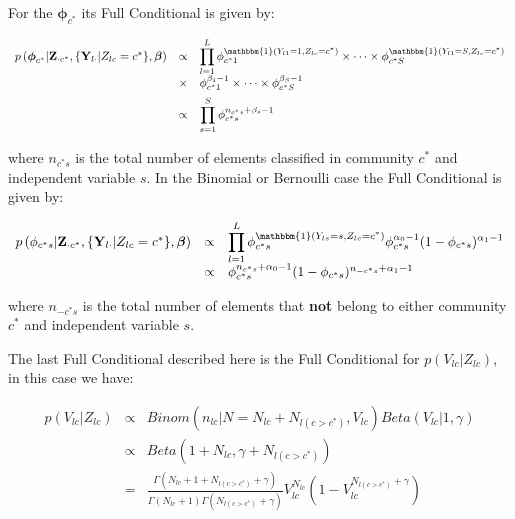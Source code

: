 \documentclass[article]{jss}
\begin{document}
For the \(\boldsymbol\phi_{c^{*}}\) its Full Conditional is given by:

\begin{equation*}
\begin{array}{lll}
p\left(\boldsymbol\phi_{c^{*}}|\mathbf{Z}_{\cdot c^{*}},\{\mathbf{Y}_{l\cdot}|Z_{lc}=c^{*}\},\boldsymbol\beta\right)&\propto& \displaystyle\prod_{l=1}^{L}\phi_{c^{*}1}^{\mathbbm{1}(Y_{l1}=1,Z_{lc}=c^{*})}\times\dots\times\phi_{c^{*}S}^{\mathbbm{1}(Y_{l1}=S,Z_{lc}=c^{*})}\\[.5em]
&\times&\phi_{c^{*}1}^{\beta_{1}-1}\times\dots\times\phi_{c^{*}S}^{\beta_{S}-1}\\[.5em]
&\propto&\displaystyle\prod_{s=1}^{S}\phi_{c^{*}s}^{n_{c^{*}s}+\beta_{s}-1}
\end{array}
\label{ap:eq0005} 
\end{equation*}

\noindent where \(n_{c^{*}s}\) is the total number of elements
classified in community \(c^{*}\) and independent variable \(s\). In the
Binomial or Bernoulli case the Full Conditional is given by:

\begin{equation*}
\begin{array}{lll}
p\left(\phi_{c^{*}s}|\mathbf{Z}_{\cdot c^{*}},\{\mathbf{Y}_{l\cdot}|Z_{lc}=c^{*}\},\boldsymbol\beta\right)&\propto&\displaystyle\prod_{l=1}^{L}\phi_{c^{*}s}^{\mathbbm{1}(Y_{ls}=s,Z_{lc}=c^{*})}\phi_{c^{*}s}^{\alpha_{0}-1}(1-\phi_{c^{*}s})^{\alpha_{1}-1}\\[.5em]
&\propto&\phi_{c^{*}s}^{n_{c^{*}s}+\alpha_{0}-1}(1-\phi_{c^{*}s})^{n_{-c^{*}s}+\alpha_{1}-1}
\end{array}
\label{ap:eq0006} 
\end{equation*}

\noindent where \(n_{-c^{*}s}\) is the total number of elements that
\textbf{not} belong to either community \(c^{*}\) and independent
variable \(s\).

The last Full Conditional described here is the Full Conditional for
\(p\left(V_{lc}|Z_{lc}\right)\), in this case we have:

\begin{equation*}
\begin{array}{lll}
p\left(V_{lc}|Z_{lc}\right)&\propto& Binom(n_{lc}|N=N_{lc}+N_{l(c>c^{*})},V_{lc})Beta(V_{lc}|1,\gamma)\\[.5em]
&\propto&Beta(1+N_{lc},\gamma+N_{l(c>c^{*})})\\[.5em]
&=&\frac{\Gamma(N_{lc}+1+N_{l(c>c^{*})}+\gamma)}{\Gamma(N_{lc}+1)\Gamma(N_{l(c>c^{*})}+\gamma)}V_{lc}^{N_{lc}}\left(1-V_{lc}^{N_{l(c>c^{*})}+\gamma}\right)
\end{array}
\label{ap:eq0007} 
\end{equation*}
\end{document}
